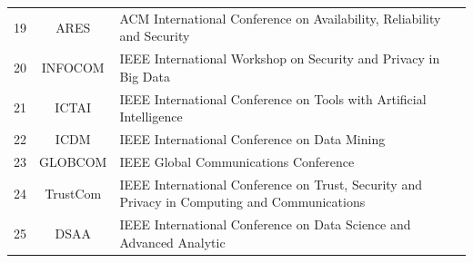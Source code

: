 \begin{table}[t!]
{\begin{tabular}{ccl}
19 & ARES    & ACM International Conference on Availability, Reliability and Security  \\
20 & INFOCOM & IEEE International Workshop on Security and Privacy in Big Data         \\
21 & ICTAI   & IEEE International Conference on Tools with Artificial Intelligence     \\
22 & ICDM    & IEEE International Conference on Data Mining                            \\
23 & GLOBCOM & IEEE Global Communications Conference                                   \\
24 & TrustCom & IEEE International Conference on Trust, Security and Privacy in Computing and Communications \\
25 & DSAA & IEEE International Conference on Data Science and Advanced Analytic \\
\bottomrule
\end{tabular}}
\label{tbl:confLegend}
\end{table}
